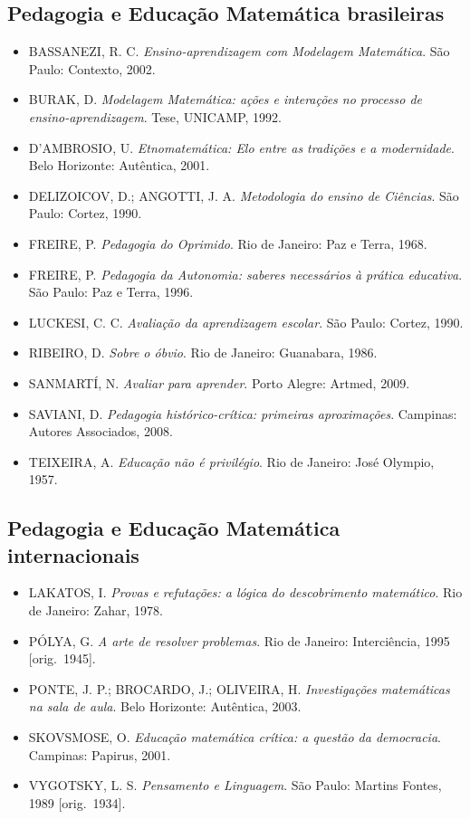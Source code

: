\documentclass[12pt,a4paper]{scrartcl}
\begin{document}
\subsection{Pedagogia e Educação Matemática brasileiras}
\begin{itemize}[leftmargin=1.3em,itemsep=0.15em,topsep=0.3em]
  \item BASSANEZI, R. C. \emph{Ensino-aprendizagem com Modelagem Matemática}. São Paulo: Contexto, 2002.
  \item BURAK, D. \emph{Modelagem Matemática: ações e interações no processo de ensino-aprendizagem}. Tese, UNICAMP, 1992.
  \item D'AMBROSIO, U. \emph{Etnomatemática: Elo entre as tradições e a modernidade}. Belo Horizonte: Autêntica, 2001.
  \item DELIZOICOV, D.; ANGOTTI, J. A. \emph{Metodologia do ensino de Ciências}. São Paulo: Cortez, 1990.
  \item FREIRE, P. \emph{Pedagogia do Oprimido}. Rio de Janeiro: Paz e Terra, 1968.
  \item FREIRE, P. \emph{Pedagogia da Autonomia: saberes necessários à prática educativa}. São Paulo: Paz e Terra, 1996.
  \item LUCKESI, C. C. \emph{Avaliação da aprendizagem escolar}. São Paulo: Cortez, 1990.
  \item RIBEIRO, D. \emph{Sobre o óbvio}. Rio de Janeiro: Guanabara, 1986.
  \item SANMARTÍ, N. \emph{Avaliar para aprender}. Porto Alegre: Artmed, 2009.
  \item SAVIANI, D. \emph{Pedagogia histórico-crítica: primeiras aproximações}. Campinas: Autores Associados, 2008.
  \item TEIXEIRA, A. \emph{Educação não é privilégio}. Rio de Janeiro: José Olympio, 1957.
\end{itemize}

\subsection{Pedagogia e Educação Matemática internacionais}
\begin{itemize}[leftmargin=1.3em,itemsep=0.15em,topsep=0.3em]
  \item LAKATOS, I. \emph{Provas e refutações: a lógica do descobrimento matemático}. Rio de Janeiro: Zahar, 1978.
  \item PÓLYA, G. \emph{A arte de resolver problemas}. Rio de Janeiro: Interciência, 1995 [orig.~1945].
  \item PONTE, J. P.; BROCARDO, J.; OLIVEIRA, H. \emph{Investigações matemáticas na sala de aula}. Belo Horizonte: Autêntica, 2003.
  \item SKOVSMOSE, O. \emph{Educação matemática crítica: a questão da democracia}. Campinas: Papirus, 2001.
  \item VYGOTSKY, L. S. \emph{Pensamento e Linguagem}. São Paulo: Martins Fontes, 1989 [orig.~1934].
\end{itemize}
\end{document}

